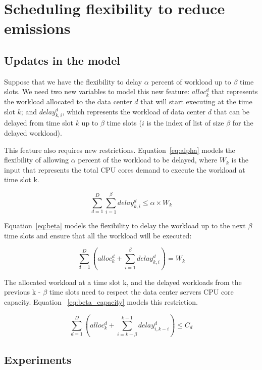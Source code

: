 \section{Scheduling flexibility to reduce  emissions}
\label{sec:flexibility}

\subsection{Updates in the model}

Suppose that we have the flexibility to delay $\alpha$ percent of workload up to $\beta$ time slots. We need two new variables to model this new feature: $alloc^d_k$ that represents the workload allocated to the data center $d$ that will start executing at the time slot $k$; and $delay_{k,i}^d$, which represents the workload of data center $d$ that can be delayed from time slot $k$ up to $\beta$ time slots ($i$ is the index of list of size $\beta$ for the delayed workload).

This feature also requires new restrictions. Equation~\eqref{eq:alpha} models the flexibility of allowing $\alpha$ percent of the workload to be delayed, where $W_k$ is the input that represents the total CPU cores demand to execute the workload at time slot k.


\begin{equation} \label{eq:alpha}
   \sum_{d=1}^D  \sum_{i=1}^{\beta} delay_{k,i}^d \leq  \alpha   \times W_k
\end{equation}


Equation~\eqref{eq:beta} models the flexibility to delay the workload up to the next $\beta$ time slots and ensure that all the workload will be executed:


\begin{equation} \label{eq:beta}
       \sum_{d=1}^D    (  alloc_k^d +    \sum_{i=1}^{\beta} delay_{k,i}^d  ) = W_k  
     \end{equation}

The allocated workload at a time slot k, and the delayed workloads from the previous k - $\beta$ time slots need to respect the data center servers CPU core capacity. Equation ~\eqref{eq:beta_capacity} models this restriction. 

\begin{equation} \label{eq:beta_capacity}
\sum_{d=1}^D    (  alloc_k^d  +    \sum_{i=k-\beta}^{k-1} delay_{  i ,  k-i  }^d  )  \leq C_d 
\end{equation}

\subsection{Experiments}

